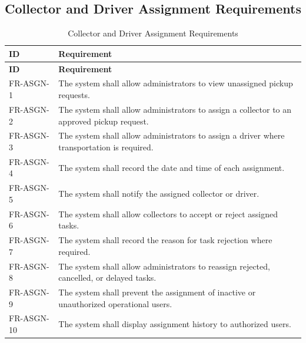 \subsection{Collector and Driver Assignment Requirements}
\begin{longtable}{@{}p{2.4cm}p{11cm}@{}}
\caption{Collector and Driver Assignment Requirements} \label{tab:fr-asgn} \\
\toprule \textbf{ID} & \textbf{Requirement} \\ \midrule
\endfirsthead
\toprule \textbf{ID} & \textbf{Requirement} \\ \midrule
\endhead
FR-ASGN-1 & The system shall allow administrators to view unassigned pickup requests. \\
FR-ASGN-2 & The system shall allow administrators to assign a collector to an approved pickup request. \\
FR-ASGN-3 & The system shall allow administrators to assign a driver where transportation is required. \\
FR-ASGN-4 & The system shall record the date and time of each assignment. \\
FR-ASGN-5 & The system shall notify the assigned collector or driver. \\
FR-ASGN-6 & The system shall allow collectors to accept or reject assigned tasks. \\
FR-ASGN-7 & The system shall record the reason for task rejection where required. \\
FR-ASGN-8 & The system shall allow administrators to reassign rejected, cancelled, or delayed tasks. \\
FR-ASGN-9 & The system shall prevent the assignment of inactive or unauthorized operational users. \\
FR-ASGN-10 & The system shall display assignment history to authorized users. \\
\bottomrule
\end{longtable}

